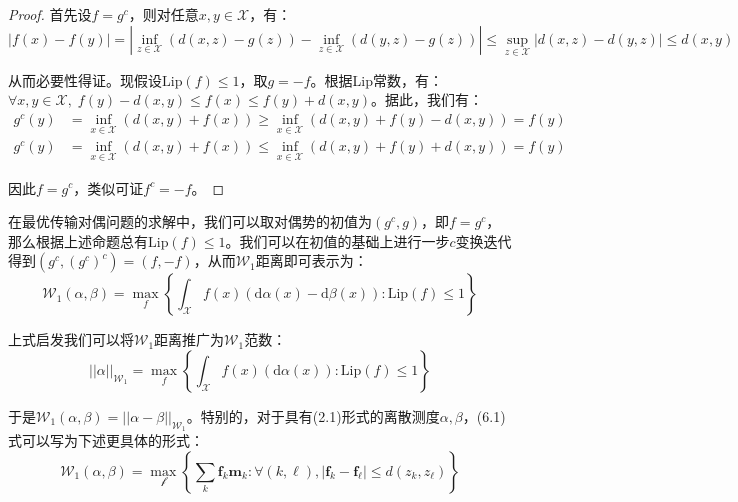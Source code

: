 \documentclass[cn,10pt,math=newtx,citestyle=gb7714-2015,bibstyle=gb7714-2015]{elegantbook}
\begin{document}
\begin{proof}
首先设$f=g^c$，则对任意$x,y\in\mathcal{X}$，有：
\begin{equation*}
    |f(x)-f(y)|=\left| \inf_{z\in\mathcal{X}} \left(d(x,z)-g(z)\right) - \inf_{z\in\mathcal{X}} \left(d(y,z)-g(z)\right) \right| \leq \sup_{z\in\mathcal{X}}|d(x,z)-d(y,z)| \leq d(x,y)
\end{equation*}

从而必要性得证。现假设$\text{Lip}(f)\leq 1$，取$g=-f$。根据Lip常数，有：$\forall x,y\in \mathcal{X}, \; f(y)-d(x,y)\leq f(x) \leq f(y) + d(x,y)$。据此，我们有：
\begin{align*}
    g^c(y) &= \inf_{x\in \mathcal{X}} \left( d(x,y)+f(x) \right) \geq \inf_{x\in \mathcal{X}} \left( d(x,y)+f(y)-d(x,y) \right)=f(y) \\
    g^c(y) &= \inf_{x\in \mathcal{X}} \left( d(x,y)+f(x) \right) \leq \inf_{x\in \mathcal{X}} \left( d(x,y)+f(y)+d(x,y) \right)=f(y)
\end{align*}

因此$f=g^c$，类似可证$f^c=-f$。
\end{proof}

\vspace{1em}

在最优传输对偶问题的求解中，我们可以取对偶势的初值为$(g^c,g)$，即$f=g^c$，那么根据上述命题总有$\text{Lip}(f)\leq 1$。我们可以在初值的基础上进行一步$c$变换迭代得到$(g^c,(g^c)^c)=(f,-f)$，从而$\mathcal{W}_1$距离即可表示为：
\begin{equation}
    \mathcal{W}_1(\alpha,\beta) = \max_f \left\{ \int_\mathcal{X} f(x)(\text{d}\alpha(x)-\text{d}\beta(x)):\text{Lip}(f)\leq 1 \right\}
\end{equation}

上式启发我们可以将$\mathcal{W}_1$距离推广为$\mathcal{W}_1$范数：
\begin{equation}
    ||\alpha||_{\mathcal{W}_1} = \max_f \left\{ \int_\mathcal{X} f(x)(\text{d}\alpha(x)):\text{Lip}(f)\leq 1 \right\}
\end{equation}

于是$\mathcal{W}_1(\alpha,\beta)=||\alpha-\beta||_{\mathcal{W}_1}$。特别的，对于具有(2.1)形式的离散测度$\alpha,\beta$，(6.1)式可以写为下述更具体的形式：
\begin{equation}
    \mathcal{W}_1(\alpha,\beta) = \max_{\mathcal{f}}\left\{ \sum_k \mathbf{f}_k\mathbf{m}_k : \forall (k,\ell), |\mathbf{f}_k-\mathbf{f}_\ell| \leq d(z_k,z_\ell) \right\}
\end{equation}
\end{document}
